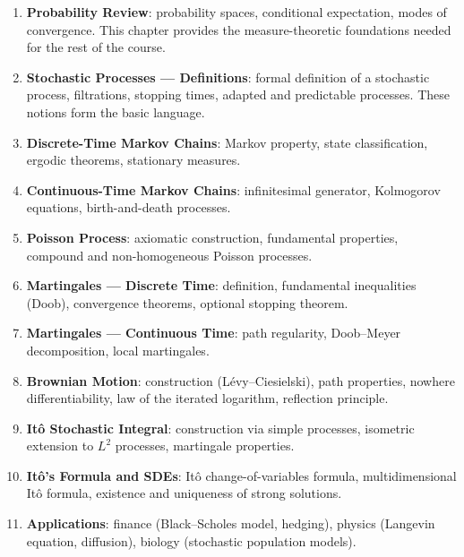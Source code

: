 \begin{enumerate}
  \item \textbf{Probability Review}: probability spaces, conditional expectation,
    modes of convergence. This chapter provides the measure-theoretic foundations
    needed for the rest of the course.

  \item \textbf{Stochastic Processes --- Definitions}: formal definition of a
    stochastic process, filtrations, stopping times, adapted and predictable
    processes. These notions form the basic language.

  \item \textbf{Discrete-Time Markov Chains}: Markov property, state
    classification, ergodic theorems, stationary measures.

  \item \textbf{Continuous-Time Markov Chains}: infinitesimal generator,
    Kolmogorov equations, birth-and-death processes.

  \item \textbf{Poisson Process}: axiomatic construction, fundamental properties,
    compound and non-homogeneous Poisson processes.

  \item \textbf{Martingales --- Discrete Time}: definition, fundamental
    inequalities (Doob), convergence theorems, optional stopping theorem.

  \item \textbf{Martingales --- Continuous Time}: path regularity, Doob--Meyer
    decomposition, local martingales.

  \item \textbf{Brownian Motion}: construction (L\'evy--Ciesielski), path
    properties, nowhere differentiability, law of the iterated logarithm,
    reflection principle.

  \item \textbf{It\^o Stochastic Integral}: construction via simple processes,
    isometric extension to $L^2$ processes, martingale properties.

  \item \textbf{It\^o's Formula and SDEs}: It\^o change-of-variables formula,
    multidimensional It\^o formula, existence and uniqueness of strong solutions.

  \item \textbf{Applications}: finance (Black--Scholes model, hedging), physics
    (Langevin equation, diffusion), biology (stochastic population models).
\end{enumerate}

